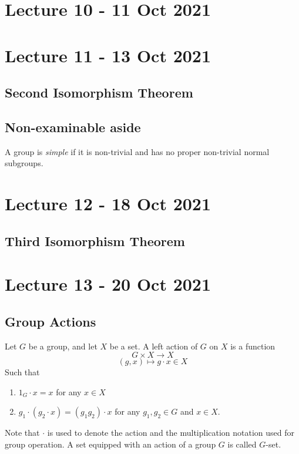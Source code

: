 \documentclass[11pt]{scrartcl}
\begin{document}
\section{Lecture 10 - 11 Oct 2021}

\section{Lecture 11 - 13 Oct 2021}

\subsection{Second Isomorphism Theorem}

\subsection{Non-examinable aside}

\begin{definition}
  A group is \emph{simple} if it is non-trivial and has no proper non-trivial normal
  subgroups.
\end{definition}

\section{Lecture 12 - 18 Oct 2021}

\subsection{Third Isomorphism Theorem}

\section{Lecture 13 - 20 Oct 2021}

\subsection{Group Actions}

\begin{definition} 
  Let $G$ be a group, and let $X$ be a set. A left action of $G$ on $X$ is a function
  \[G\times X \to X\]
  \[(g,x)\mapsto g\cdot x\in X\]
  Such that
  \begin{enumerate}
    \item $1_G \cdot x=x$ for any $x\in X$
    \item $g_1 \cdot (g_2\cdot x) = (g_1g_2)\cdot x$ for any $g_1,g_2\in G$ and $x\in X$.
  \end{enumerate}
  Note that $\cdot$ is used to denote the action and the multiplication notation used for
  group operation. A set equipped with an action of a group $G$ is called $G$-set.
  \label{def:leftAction}
\end{definition}
\end{document}

